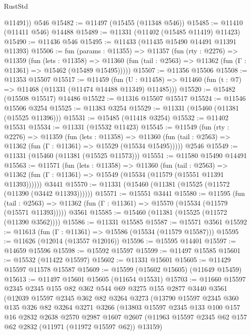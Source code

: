 \begin{lexlean}{RustStd}
\begin{coremodule}
        @11491))
    @546
@15482 := @11497 (@15455 (@11348 @546))
@15485 := @11410 (@11411 @546) @14488
@15489 := @11331 (@11402 (@15485 @11419) @11423)
@15490 := @11436 @546
@15495 := @11433 (@11435 @15490 @14491 @11391 @11393)
@15506 := fun (params : @11355) =>
  @11357
    (fun (rty : @2276) =>
    @11359
      (fun (lets : @11358) =>
      @11360 (fun (tail : @2563) => @11362 (fun (Γ : @11361) => @15462 (@15489 @15495)))))
@15507 := @11356 @15506
@15508 := @11353 @15507
@15517 := @11459
    (fun (U : @11458) => @11460 (fun (t : @7) => @11468 (@11331 (@11474 @14488 @11349) @11485)))
@15520 := @15482 (@15508 @15517) @14486
@15522 := @11316 @15507 @15517
@15524 := @11546 @15506 @3254
@15525 := @11383 @3254
@15529 := @11331 (@15460 (@11381 (@15525 @11396)))
@15531 := @15485 (@11418 @3254)
@15532 := @11402 @15531
@15534 := @11331 (@15532 @11423)
@15545 := @11549
    (fun (rty : @2276) =>
    @11359
      (fun (lets : @11358) =>
      @11360 (fun (tail : @2563) => @11362 (fun (Γ : @11361) => @15529 (@15534 @15495)))))
    @2546
@15549 := @11331 (@15460 (@11381 (@15525 @11573)))
@15551 := @11580 @15490 @14491
@15563 := @11571
    (fun (lets : @11358) =>
    @11360
      (fun (tail : @2563) =>
      @11362 (fun (Γ : @11361) => @15549 (@15534 (@11579 (@15551 @11391 @11393))))))
    @3441
@15570 := @11331 (@15460 (@11381 (@15525 (@11572 (@11390 (@3442 @11393))))))
@15571 := @15551 @3441
@15580 := @11595
    (fun (tail : @2563) => @11362 (fun (Γ : @11361) => @15570 (@15534 (@11579 (@15571 @11393)))))
    @3561
@15585 := @15460 (@11381 (@15525 (@11572 (@11390 @3562))))
@15586 := @11331 @15585
@15587 := @15571 @3561
@15592 := @11613 (fun (Γ : @11361) => @15586 (@15534 (@11579 @15587)))
@15595 := @11626 (@12014 (@13557 @12016))
@15596 := @15595 @14401
@15597 := @14659 @15596
@15598 := @15592 @15597
@15599 := @11497 @15585
@15601 := @15532 (@11422 @15597)
@15602 := @11331 @15601
@15605 := @11429 @15597 @11578 @15587
@15609 := @15599 (@15602 @15605) (@11649 @15459)
@15613 := @11497 @15601 @15605 (@11654 @15531)
@15703 := @11660
    @15597
    @2345
    @2345
    @155
    @82
    @362
    @544
    @69
    @3275
    @155
    @2877
    @3440
    @3561
    (@12039
      @15597
      @2345
      @362
      @82
      @3264
      @3273
      (@13790
        @15597
        @2345
        @360
        @135
        @326
        @82
        @3264
        @3271
        @3266
        (@13803
          @15597
          @2345
          @133
          @100
          @157
          @16
          @2832
          @2638
          @2570
          @2987
          @1607
          @2607
          (@11963 @15597 @2345 @62 @157 @62 @2832 (@11971 (@11972 @15597 @62)) @13159)

\end{coremodule}
\end{lexlean}
